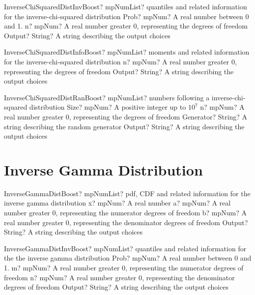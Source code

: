\documentclass[12pt,a4paper,openany]{book}
\begin{document}
\begin{mpFunctionsExtract}
\mpFunctionThreeNotImplemented
{InverseChiSquaredDistInvBoost? mpNumList? quantiles and related information for the inverse-chi-squared distribution}
{Prob? mpNum? A real number between 0 and 1.}
{n? mpNum? A real number greater 0, representing the degrees of freedom}
{Output? String? A string describing the output choices}
\end{mpFunctionsExtract}

\begin{mpFunctionsExtract}
\mpFunctionTwoNotImplemented
{InverseChiSquaredDistInfoBoost? mpNumList? moments and related information for the inverse-chi-squared distribution}
{n? mpNum? A real number greater 0, representing the degrees of freedom}
{Output? String? A string describing the output choices}
\end{mpFunctionsExtract}

\begin{mpFunctionsExtract}
\mpFunctionFourNotImplemented
{InverseChiSquaredDistRanBoost? mpNumList? numbers following a inverse-chi-squared distribution}
{Size? mpNum? A positive integer up to $10^7$}
{n? mpNum? A real number greater 0, representing the degrees of freedom}
{Generator? String? A string describing the random generator}
{Output? String? A string describing the output choices}
\end{mpFunctionsExtract}

\section{Inverse Gamma Distribution}

\begin{mpFunctionsExtract}
\mpFunctionFourNotImplemented
{InverseGammaDistBoost? mpNumList? pdf, CDF and related information for the inverse gamma distribution}
{x? mpNum? A real number}
{a? mpNum? A real number greater 0, representing the numerator  degrees of freedom}
{b? mpNum? A real number greater 0, representing the denominator degrees of freedom}
{Output? String? A string describing the output choices}
\end{mpFunctionsExtract}

\begin{mpFunctionsExtract}
\mpFunctionFourNotImplemented
{InverseGammaDistInvBoost? mpNumList? quantiles and related information for the the inverse gamma distribution}
{Prob? mpNum? A real number between 0 and 1.}
{m? mpNum? A real number greater 0, representing the numerator  degrees of freedom}
{n? mpNum? A real number greater 0, representing the denominator degrees of freedom}
{Output? String? A string describing the output choices}
\end{mpFunctionsExtract}
\end{document}
